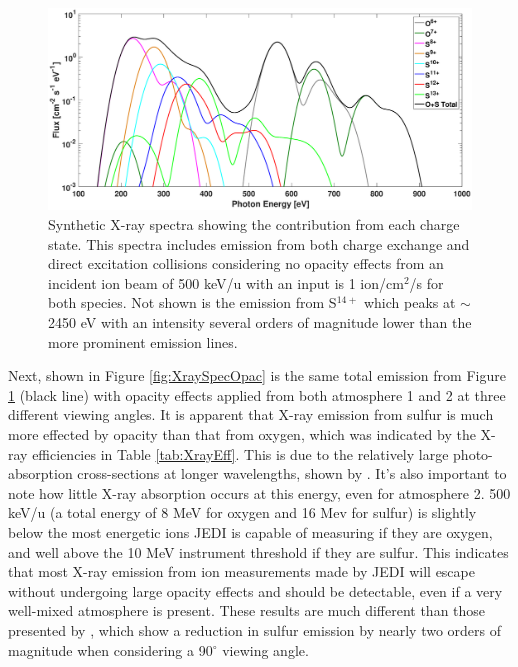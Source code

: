 \documentclass[draft]{agujournal2018}
\begin{document}
\begin{figure}[ht]
    \centering
    \includegraphics[width=\textwidth]{Figures/O+S_CX+DE_500keVNoOpacSpec.eps}
    \caption{Synthetic X-ray spectra showing the contribution from each charge state. This spectra includes emission from both charge exchange and direct excitation collisions considering no opacity effects from an incident ion beam of 500 keV/u with an input is 1 ion/cm$^2$/s for both species. Not shown is the emission from S$^{14+}$ which peaks at $\sim$2450 eV with an intensity several orders of magnitude lower than the more prominent emission lines.}
    \label{fig:XraySpec}
\end{figure}

Next, shown in Figure \ref{fig:XraySpecOpac} is the same total emission from Figure \ref{fig:XraySpec} (black line) with opacity effects applied from both atmosphere 1 and 2 at three different viewing angles.
It is apparent that X-ray emission from sulfur is much more effected by opacity than that from oxygen, which was indicated by the X-ray efficiencies in Table \ref{tab:XrayEff}.
This is due to the relatively large photo-absorption cross-sections at longer wavelengths, shown by \citet{cravens2006}.
It's also important to note how little X-ray absorption occurs at this energy, even for atmosphere 2.
500 keV/u (a total energy of 8 MeV for oxygen and 16 Mev for sulfur) is slightly below the most energetic ions JEDI is capable of measuring if they are oxygen, and well above the 10 MeV instrument threshold \citep{mauk2017ssr} if they are sulfur.
This indicates that most X-ray emission from ion measurements made by JEDI will escape without undergoing large opacity effects and should be detectable, even if a very well-mixed atmosphere is present.
These results are much different than those presented by \citet{ozak2010}, which show a reduction in sulfur emission by nearly two orders of magnitude when considering a 90$^{\circ}$ viewing angle.
\end{document}
